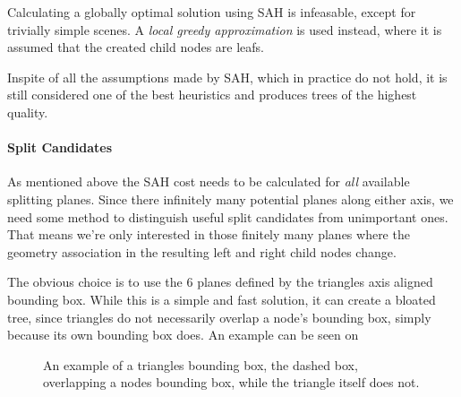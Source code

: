 
Calculating a globally optimal solution using SAH is infeasable,
except for trivially simple scenes. A \textit{local greedy
  approximation} is used instead, where it is assumed that the created
child nodes are leafs.

Inspite of all the assumptions made by SAH, which in practice do not
hold, it is still considered one of the best heuristics and produces
trees of the highest quality.



\paragraph{Split Candidates}


As mentioned above the SAH cost needs to be calculated for
\textit{all} available splitting planes. Since there infinitely many
potential planes along either axis, we need some method to distinguish
useful split candidates from unimportant ones. That means we're only
interested in those finitely many planes where the geometry
association in the resulting left and right child nodes change.


The obvious choice is to use the 6 planes defined by the triangles
axis aligned bounding box. While this is a simple and fast solution,
it can create a bloated tree, since triangles do not necessarily
overlap a node's bounding box, simply because its own bounding box
does. An example can be seen on 

\begin{figure}
  \centering
  \caption[Triangle/Node bounding box intersection.]{An example of a
    triangles bounding box, the dashed box, overlapping a nodes
    bounding box, while the triangle itself does not.}
  \label{fig:aabbSplit}
\end{figure}


